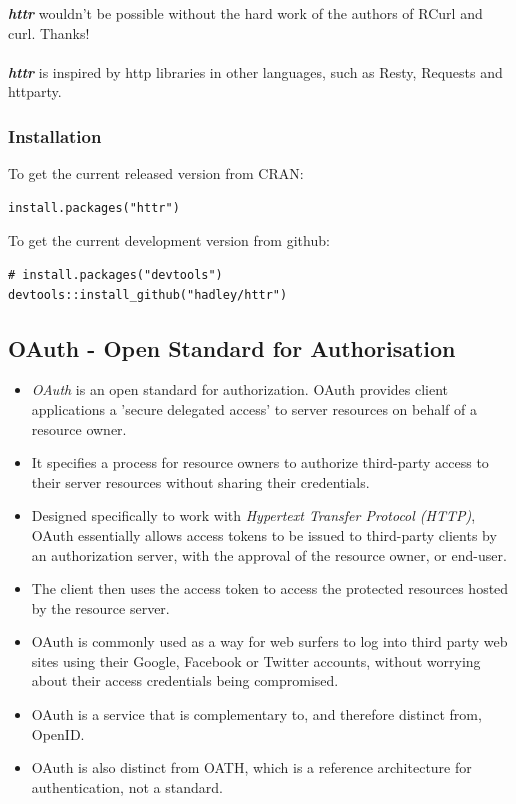 \noindent \textbf{\textit{httr}} wouldn't be possible without the hard work of the authors of RCurl and curl. Thanks! \\\\ \textbf{\textit{httr}} is inspired by http libraries in other languages, such as Resty, Requests and httparty.

\newpage
\subsubsection*{Installation}

To get the current released version from CRAN:
\begin{framed}
\begin{verbatim}
install.packages("httr")
\end{verbatim}
\end{framed}
To get the current development version from github:
\begin{framed}
\begin{verbatim}
# install.packages("devtools")
devtools::install_github("hadley/httr")
\end{verbatim}
\end{framed}
\newpage

\subsection*{OAuth - Open Standard for Authorisation}



\begin{itemize}
\item \textit{OAuth} is an open standard for authorization. OAuth provides client applications a 'secure delegated access' to server resources on behalf of a resource owner. 
\item It specifies a process for resource owners to authorize third-party access to their server resources without sharing their credentials. 
\item Designed specifically to work with \textit{Hypertext Transfer Protocol (HTTP)}, OAuth essentially allows access tokens to be issued to third-party clients by an authorization server, with the approval of the resource owner, or end-user.
\item The client then uses the access token to access the protected resources hosted by the resource server.
\item OAuth is commonly used as a way for web surfers to log into third party web sites using their Google, Facebook or Twitter accounts, without worrying about their access credentials being compromised.

\item OAuth is a service that is complementary to, and therefore distinct from, OpenID. 
\item OAuth is also distinct from OATH, which is a reference architecture for authentication, not a standard.
\end{itemize}


